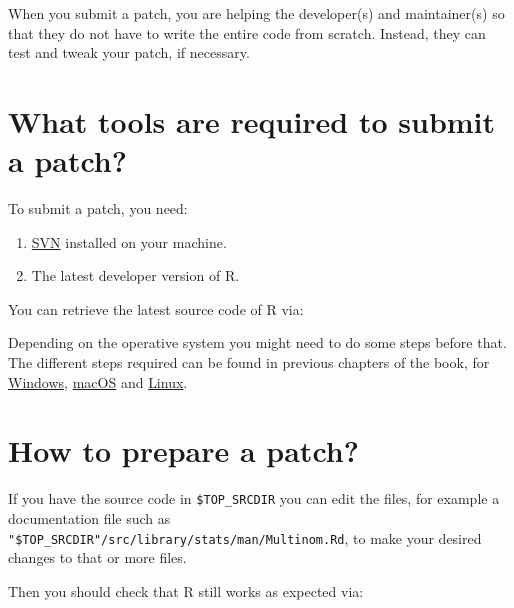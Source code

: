 \documentclass[
]{book}
\newenvironment{Shaded}{\begin{snugshade}}{\end{snugshade}}
\newcommand{\BuiltInTok}[1]{#1}
\newcommand{\FunctionTok}[1]{\textcolor[rgb]{0.13,0.29,0.53}{\textbf{#1}}}
\newcommand{\NormalTok}[1]{#1}
\newcommand{\OperatorTok}[1]{\textcolor[rgb]{0.81,0.36,0.00}{\textbf{#1}}}
\newcommand{\StringTok}[1]{\textcolor[rgb]{0.31,0.60,0.02}{#1}}
\newcommand{\VariableTok}[1]{\textcolor[rgb]{0.00,0.00,0.00}{#1}}
\begin{document}
When you submit a patch, you are helping the developer(s) and maintainer(s) so that they do not have to write the entire code from scratch. Instead, they can test and tweak your patch, if necessary.

\section{What tools are required to submit a patch?}\label{what-tools-are-required-to-submit-a-patch}

To submit a patch, you need:

\begin{enumerate}
\def\labelenumi{\arabic{enumi}.}
\item
  \href{http://subversion.apache.org/}{SVN} installed on your machine.
\item
  The latest developer version of R.
\end{enumerate}

You can retrieve the latest source code of R via:

\begin{Shaded}
\end{Shaded}

Depending on the operative system you might need to do some steps before that.
The different steps required can be found in previous chapters of the book, for \hyperref[windowsSource]{Windows}, \hyperref[macos]{macOS} and \hyperref[linux]{Linux}.

\section{How to prepare a patch?}\label{how-to-prepare-a-patch}

If you have the source code in \texttt{\$TOP\_SRCDIR} you can edit the files, for example a documentation file such as \texttt{"\$TOP\_SRCDIR"/src/library/stats/man/Multinom.Rd}, to make your desired changes to that or more files.

Then you should check that R still works as expected via:

\begin{Shaded}
\end{Shaded}
\end{document}
